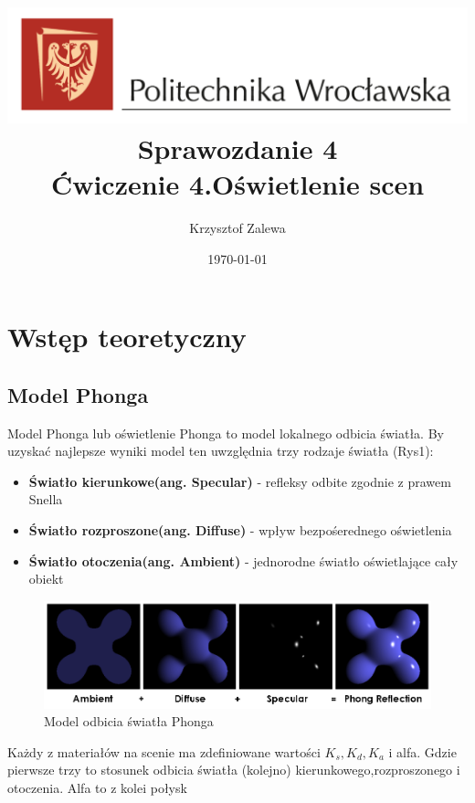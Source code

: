 \documentclass{article}
\title{
  \centering
  \includegraphics[width=\textwidth]{images/logo_PWr_kolor_poziom.png}\\
  \fontsize{28pt}{30pt}\selectfont Sprawozdanie 4\\
  \fontsize{14pt}{30pt}\selectfont Ćwiczenie 4.Oświetlenie scen}
\author{Krzysztof Zalewa}
\date{\daymonthyear\today}
\begin{document}
  \maketitle
  \pagebreak
  \tableofcontents
  \section{Wstęp teoretyczny}
  \subsection{Model Phonga}
  Model Phonga lub oświetlenie Phonga to model lokalnego odbicia światła. By
  uzyskać najlepsze wyniki model ten uwzględnia trzy rodzaje światła (Rys1):
  \begin{itemize}
    \item \textbf{Światło kierunkowe(ang. Specular)} - refleksy odbite zgodnie z prawem Snella 
    \item \textbf{Światło rozproszone(ang. Diffuse)} - wpływ bezpośerednego oświetlenia
    \item \textbf{Światło otoczenia(ang. Ambient)} - jednorodne światło oświetlające cały obiekt
  \end{itemize}
  \begin{figure}[ht]
    \centering
    \includegraphics[width=\textwidth]{images/Phong_components_version_4.png}
    \caption{Model odbicia światła Phonga}
    \label{fig:phong}
  \end{figure}
  \FloatBarrier
  Każdy z materiałów na scenie ma zdefiniowane wartości $K_s,K_d,K_a$ 
  i alfa. Gdzie pierwsze trzy to stosunek odbicia światła (kolejno) kierunkowego,rozproszonego i otoczenia. 
  Alfa to z kolei połysk
\end{document}
